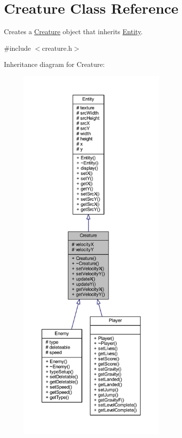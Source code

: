 \hypertarget{class_creature}{\section{Creature Class Reference}
\label{class_creature}
}


Creates a \hyperlink{class_creature}{Creature} object that inherits \hyperlink{class_entity}{Entity}.  




{\ttfamily \#include $<$creature.\+h$>$}



Inheritance diagram for Creature\+:
\nopagebreak
\begin{figure}[H]
\begin{center}
\leavevmode
\includegraphics[height=550pt]{class_creature__inherit__graph}
\end{center}
\end{figure}


